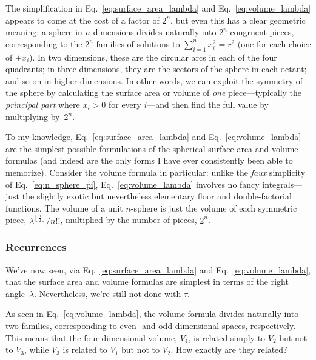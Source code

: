 The simplification in Eq.~\eqref{eq:surface_area_lambda} and Eq.~\eqref{eq:volume_lambda} appears to come at the cost of a factor of $2^n$, but even this has a clear geometric meaning: a sphere in $n$ dimensions divides naturally into $2^n$ congruent pieces, corresponding to the $2^n$ families of solutions to $\sum_{i=1}^{n} x_i^2 = r^2$ (one for each choice of $\pm x_i$). In two dimensions, these are the circular arcs in each of the four quadrants; in three dimensions, they are the sectors of the sphere in each octant; and so on in higher dimensions. In other words, we can exploit the symmetry of the sphere by calculating the surface area or volume of \emph{one} piece---typically the \emph{principal part} where $x_i > 0$ for every $i$---and then find the full value by multiplying by~$2^n$.

To my knowledge, Eq.~\eqref{eq:surface_area_lambda} and Eq.~\eqref{eq:volume_lambda} are the simplest possible formulations of the spherical surface area and volume formulas (and indeed are the only forms I have ever consistently been able to memorize). Consider the volume formula in particular: unlike the \emph{faux} simplicity of Eq.~\eqref{eq:n_sphere_pi}, Eq.~\eqref{eq:volume_lambda} involves no fancy integrals---just the slightly exotic but nevertheless elementary floor and double-factorial functions. The volume of a unit $n$-sphere is just the volume of each symmetric piece, $\lambda^{\left\lfloor \frac{n}{2} \right\rfloor}/n!!$, multiplied by the number of pieces, $2^n$.


\subsubsection{Recurrences} %
\label{sec:recurrences}

We've now seen, via Eq.~\eqref{eq:surface_area_lambda} and Eq.~\eqref{eq:volume_lambda}, that the surface area and volume formulas are simplest in terms of the right angle~$\lambda$. Nevertheless, we're still not done with $\tau$.

As seen in Eq.~\eqref{eq:volume_lambda}, the volume formula divides naturally into two families, corresponding to even- and odd-dimensional spaces, respectively. This means that the four-dimensional volume, $V_4$, is related simply to $V_2$ but not to $V_3$, while $V_3$ is related to $V_1$ but not to $V_2$. How exactly are they related?

